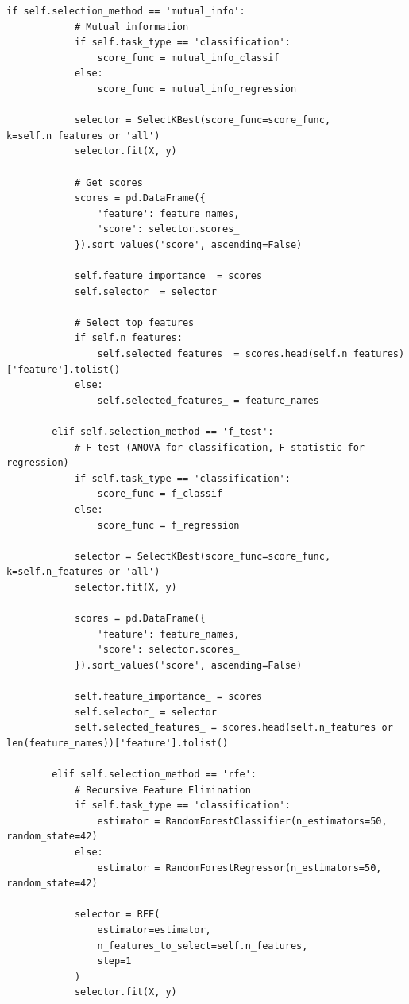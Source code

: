 \begin{lstlisting}[style=python, caption={Comprehensive Feature Selection Framework}]
        if self.selection_method == 'mutual_info':
            # Mutual information
            if self.task_type == 'classification':
                score_func = mutual_info_classif
            else:
                score_func = mutual_info_regression

            selector = SelectKBest(score_func=score_func, k=self.n_features or 'all')
            selector.fit(X, y)

            # Get scores
            scores = pd.DataFrame({
                'feature': feature_names,
                'score': selector.scores_
            }).sort_values('score', ascending=False)

            self.feature_importance_ = scores
            self.selector_ = selector

            # Select top features
            if self.n_features:
                self.selected_features_ = scores.head(self.n_features)['feature'].tolist()
            else:
                self.selected_features_ = feature_names

        elif self.selection_method == 'f_test':
            # F-test (ANOVA for classification, F-statistic for regression)
            if self.task_type == 'classification':
                score_func = f_classif
            else:
                score_func = f_regression

            selector = SelectKBest(score_func=score_func, k=self.n_features or 'all')
            selector.fit(X, y)

            scores = pd.DataFrame({
                'feature': feature_names,
                'score': selector.scores_
            }).sort_values('score', ascending=False)

            self.feature_importance_ = scores
            self.selector_ = selector
            self.selected_features_ = scores.head(self.n_features or len(feature_names))['feature'].tolist()

        elif self.selection_method == 'rfe':
            # Recursive Feature Elimination
            if self.task_type == 'classification':
                estimator = RandomForestClassifier(n_estimators=50, random_state=42)
            else:
                estimator = RandomForestRegressor(n_estimators=50, random_state=42)

            selector = RFE(
                estimator=estimator,
                n_features_to_select=self.n_features,
                step=1
            )
            selector.fit(X, y)


\end{lstlisting}
